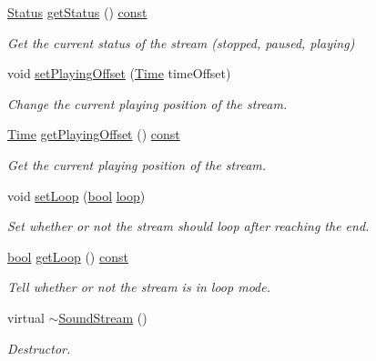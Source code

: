 \begin{DoxyCompactItemize}
\hyperlink{classsf_1_1_sound_source_ac43af72c98c077500b239bc75b812f03}{Status} \hyperlink{classsf_1_1_sound_stream_a75f722e7edcfa9952ff0c643966c6858}{get\-Status} () \hyperlink{term__entry_8h_a57bd63ce7f9a353488880e3de6692d5a}{const} 
\begin{DoxyCompactList}\small\item\em Get the current status of the stream (stopped, paused, playing) \end{DoxyCompactList}\item 
void \hyperlink{classsf_1_1_sound_stream_af416a5f84c8750d2acb9821d78bc8646}{set\-Playing\-Offset} (\hyperlink{classsf_1_1_time}{Time} time\-Offset)
\begin{DoxyCompactList}\small\item\em Change the current playing position of the stream. \end{DoxyCompactList}\item 
\hyperlink{classsf_1_1_time}{Time} \hyperlink{classsf_1_1_sound_stream_a6070416e1e1a11b5915e9314dd6638f7}{get\-Playing\-Offset} () \hyperlink{term__entry_8h_a57bd63ce7f9a353488880e3de6692d5a}{const} 
\begin{DoxyCompactList}\small\item\em Get the current playing position of the stream. \end{DoxyCompactList}\item 
void \hyperlink{classsf_1_1_sound_stream_a43fade018ffba7e4f847a9f00b353f3d}{set\-Loop} (\hyperlink{term__entry_8h_a002004ba5d663f149f6c38064926abac}{bool} \hyperlink{_lapin_8cpp_ae75dc9a105e970734a903222f40b464c}{loop})
\begin{DoxyCompactList}\small\item\em Set whether or not the stream should loop after reaching the end. \end{DoxyCompactList}\item 
\hyperlink{term__entry_8h_a002004ba5d663f149f6c38064926abac}{bool} \hyperlink{classsf_1_1_sound_stream_ad8bbf6c0d2ff2d75e19035dea3fd77c3}{get\-Loop} () \hyperlink{term__entry_8h_a57bd63ce7f9a353488880e3de6692d5a}{const} 
\begin{DoxyCompactList}\small\item\em Tell whether or not the stream is in loop mode. \end{DoxyCompactList}\item 
virtual \hyperlink{classsf_1_1_sound_stream_a1fafb9f1ca572d23d7d6a17921860d85}{$\sim$\-Sound\-Stream} ()
\begin{DoxyCompactList}\small\item\em Destructor. \end{DoxyCompactList}\item 

\end{DoxyCompactItemize}
